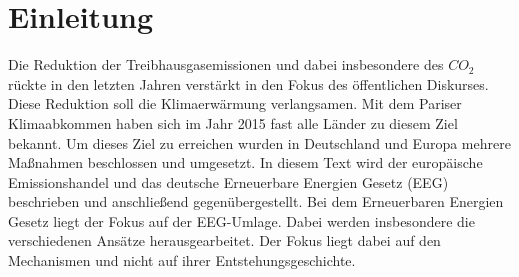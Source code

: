 \chapter{Einleitung}
Die Reduktion der Treibhausgasemissionen und dabei insbesondere des $CO_2$ rückte in den letzten Jahren verstärkt in den Fokus des öffentlichen Diskurses.
Diese Reduktion soll die Klimaerwärmung verlangsamen.
Mit dem Pariser Klimaabkommen haben sich im Jahr 2015 fast alle Länder zu diesem Ziel bekannt.
Um dieses Ziel zu erreichen wurden in Deutschland und Europa mehrere Maßnahmen beschlossen und umgesetzt.
In diesem Text wird der europäische Emissionshandel und das deutsche Erneuerbare Energien Gesetz (EEG) beschrieben und anschließend gegenübergestellt. 
Bei dem Erneuerbaren Energien Gesetz liegt der Fokus auf der EEG-Umlage.
Dabei werden insbesondere die verschiedenen Ansätze herausgearbeitet.
Der Fokus liegt dabei auf den Mechanismen und nicht auf ihrer Entstehungsgeschichte.